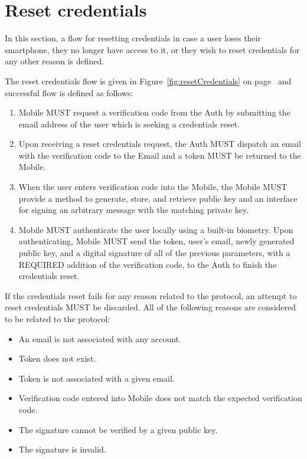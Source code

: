\section{Reset credentials}
In this section, a flow for resetting credentials in case a user loses their smartphone, they no longer have access to it,
or they wish to reset credentials for any other reason is defined.
\medskip

The reset credentials flow is given in Figure~\ref{fig:resetCredentials} on page~\pageref{fig:resetCredentials} 
and successful flow is defined as follows:
    \begin{enumerate}
        \item Mobile MUST request a verification code from the Auth by submitting the email address of the user
              which is seeking a credentials reset.
        \item Upon receiving a reset credentials request, the Auth MUST dispatch an email with the verification
              code to the Email and a token MUST be returned to the Mobile.
        \item When the user enters verification code into the Mobile, the Mobile MUST provide a method to generate,
              store, and retrieve public key and an interface for signing an arbitrary message with the matching 
              private key.
        \item Mobile MUST authenticate the user locally using a built-in biometry. Upon authenticating, Mobile 
              MUST send the token, user's email, newly generated public key, and a digital signature of all of the 
              previous parameters, with a REQUIRED addition of the verification code, to the Auth to finish the 
              credentials reset.
    \end{enumerate}
    
If the credentials reset fails for any reason related to the protocol, an attempt to reset credentials MUST 
be discarded. All of the following reasons are considered to be related to the protocol:
    \begin{itemize}
        \item An email is not associated with any account.
        \item Token does not exist.
        \item Token is not associated with a given email.
        \item Verification code entered into Mobile does not match the expected verification code.
        \item The signature cannot be verified by a given public key.
        \item The signature is invalid.
    \end{itemize}
